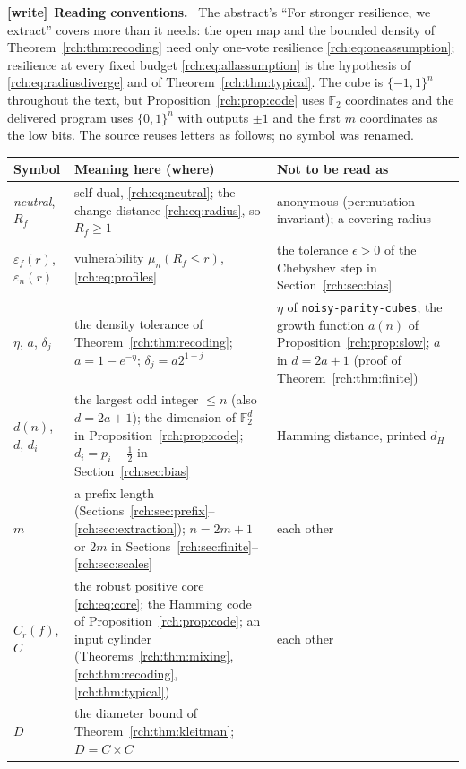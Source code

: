 \documentclass[11pt]{article}
\theoremstyle{definition}
\theoremstyle{remark}
\newcommand{\F}{\mathbb F}
\newcommand{\eps}{\varepsilon}
\newcommand{\file}[1]{\nolinkurl{#1}}
\newenvironment{writenote}[1][]{\par\smallskip\begingroup\small
 \noindent\textbf{[write]}\if\relax\detokenize{#1}\relax\else~\textbf{#1.}\fi\ }%
 {\par\endgroup\smallskip}
\begin{document}
\begin{writenote}[Reading conventions]
The abstract's ``For stronger resilience, we extract'' covers more than it
needs: the open map and the bounded density of
Theorem~\ref{rch:thm:recoding} need only one-vote resilience
\eqref{rch:eq:oneassumption}; resilience at every fixed budget
\eqref{rch:eq:allassumption} is the hypothesis of
\eqref{rch:eq:radiusdiverge} and of Theorem~\ref{rch:thm:typical}. The
cube is $\{-1,1\}^n$ throughout the text, but
Proposition~\ref{rch:prop:code} uses $\F_2$ coordinates and the delivered
program uses $\{0,1\}^n$ with outputs $\pm1$ and the first $m$ coordinates as
the low bits. The source reuses letters as follows; no symbol was renamed.
\end{writenote}
\begin{center}\small
\renewcommand{\arraystretch}{1.12}
\begin{tabularx}{\textwidth}{@{}P{0.16\textwidth}YP{0.27\textwidth}@{}}
\toprule
Symbol & Meaning here (where) & Not to be read as\\
\midrule
\emph{neutral}, $R_f$ & self-dual, \eqref{rch:eq:neutral}; the change
 distance \eqref{rch:eq:radius}, so $R_f\ge1$ & anonymous (permutation
 invariant); a covering radius\\
$\eps_f(r)$, $\eps_n(r)$ & vulnerability $\mu_n(R_f\le r)$,
 \eqref{rch:eq:profiles} & the tolerance $\epsilon>0$ of the Chebyshev step
 in Section~\ref{rch:sec:bias}\\
$\eta$, $a$, $\delta_j$ & the density tolerance of
 Theorem~\ref{rch:thm:recoding}; $a=1-e^{-\eta}$; $\delta_j=a2^{1-j}$ &
 $\eta$ of \file{noisy-parity-cubes}; the growth function $a(n)$ of
 Proposition~\ref{rch:prop:slow}; $a$ in $d=2a+1$ (proof of
 Theorem~\ref{rch:thm:finite})\\
$d(n)$, $d$, $d_i$ & the largest odd integer $\le n$ (also $d=2a+1$);
 the dimension of $\F_2^d$ in Proposition~\ref{rch:prop:code};
 $d_i=p_i-\frac12$ in Section~\ref{rch:sec:bias} & Hamming distance, printed
 $d_H$\\
$m$ & a prefix length (Sections~\ref{rch:sec:prefix}--\ref{rch:sec:extraction});
 $n=2m+1$ or $2m$ in Sections~\ref{rch:sec:finite}--\ref{rch:sec:scales} &
 each other\\
$C_r(f)$, $C$ & the robust positive core \eqref{rch:eq:core}; the Hamming
 code of Proposition~\ref{rch:prop:code}; an input cylinder
 (Theorems~\ref{rch:thm:mixing}, \ref{rch:thm:recoding}, \ref{rch:thm:typical})
 & each other\\
$D$ & the diameter bound of Theorem~\ref{rch:thm:kleitman}; $D=C\times C$

\end{tabularx}
\end{center}
\end{document}
